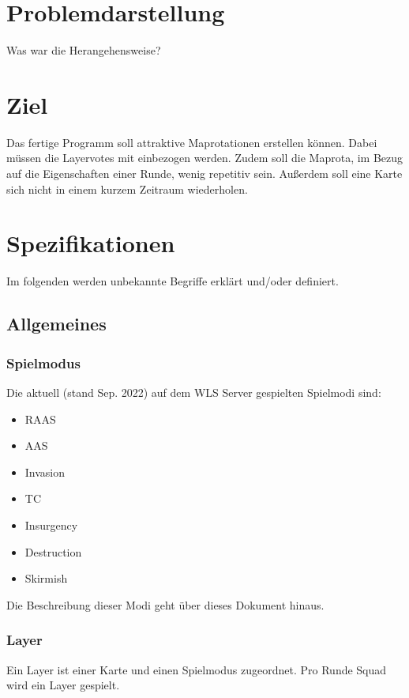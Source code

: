 \documentclass[a4paper, 11pt]{scrreprt}
\begin{document}
    \section{Problemdarstellung}
        Was war die Herangehensweise?

    \section{Ziel}
        Das fertige Programm soll attraktive Maprotationen erstellen können.
        Dabei müssen die Layervotes mit einbezogen werden. Zudem soll die Maprota, im Bezug auf die Eigenschaften einer Runde, wenig repetitiv sein.
        Außerdem soll eine Karte sich nicht in einem kurzem Zeitraum wiederholen.

    \section{Spezifikationen}
    Im folgenden werden unbekannte Begriffe erklärt und/oder definiert.
        \subsection{Allgemeines}
            \subsubsection{Spielmodus}
                Die aktuell (stand Sep. 2022) auf dem \ac{WLS} Server gespielten Spielmodi sind:\\
                \begin{itemize}
                    \item \ac{RAAS}
                    \item \ac{AAS}
                    \item Invasion
                    \item \ac{TC}
                    \item Insurgency
                    \item Destruction
                    \item Skirmish
                \end{itemize}
                Die Beschreibung dieser Modi geht über dieses Dokument hinaus.
            \subsubsection{Layer}
                Ein Layer ist einer Karte und einen Spielmodus zugeordnet.
                Pro Runde Squad wird ein Layer gespielt. 
\end{document}
